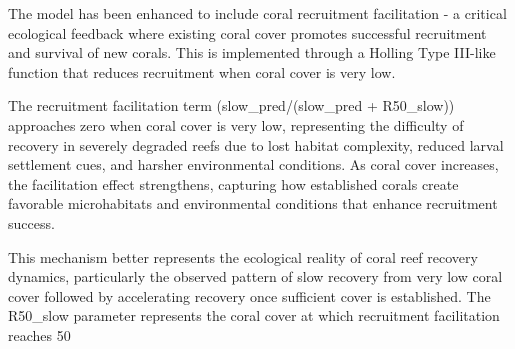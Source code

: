 The model has been enhanced to include coral recruitment facilitation - a critical ecological feedback where existing coral cover promotes successful recruitment and survival of new corals. This is implemented through a Holling Type III-like function that reduces recruitment when coral cover is very low.

The recruitment facilitation term (slow_pred/(slow_pred + R50_slow)) approaches zero when coral cover is very low, representing the difficulty of recovery in severely degraded reefs due to lost habitat complexity, reduced larval settlement cues, and harsher environmental conditions. As coral cover increases, the facilitation effect strengthens, capturing how established corals create favorable microhabitats and environmental conditions that enhance recruitment success.

This mechanism better represents the ecological reality of coral reef recovery dynamics, particularly the observed pattern of slow recovery from very low coral cover followed by accelerating recovery once sufficient cover is established. The R50_slow parameter represents the coral cover at which recruitment facilitation reaches 50%
